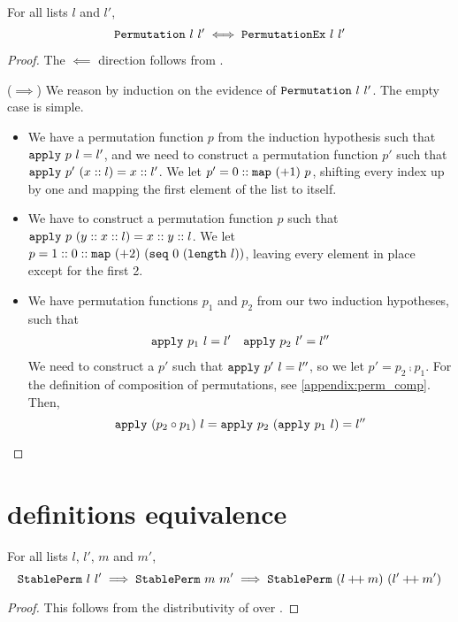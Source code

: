 \documentclass[sigplan,10pt,anonymous,review]{thesis}
\begin{document}
\begin{theorem}
  \label{thm:permutationex_iff}
  For all lists $l$ and $l'$,
  \begin{equation*}
    \texttt{\textup{Permutation}}~l~l' \iff \texttt{\textup{PermutationEx}}~l~l'
  \end{equation*}
\end{theorem}
\begin{proof}
  The $\impliedby$ direction follows from .

  ($\implies$) We reason by induction on the evidence of
  $\texttt{\textup{Permutation}}~l~l'$. The empty case is simple.
  \begin{itemize}
  \item We have a permutation function $p$ from the induction
    hypothesis such that $\texttt{\textup{apply}}~p~l = l'$, and we need to
    construct a permutation function $p'$ such that
    $\texttt{\textup{apply}}~p'~(x::l) = x :: l'$. We let $p' = 0 ::
    \texttt{\textup{map}}~(+1)~p$, shifting every index up by one and mapping
    the first element of the list to itself.
  \item We have to construct a permutation function $p$ such that
    $\texttt{\textup{apply}}~p~(y :: x :: l) = x :: y :: l$. We let $p = 1 :: 0 ::
    \texttt{\textup{map}}~(+2)~(\texttt{\textup{seq}}~0~(\texttt{\textup{length}}~l))$, leaving every
    element in place except for the first 2.
  \item We have permutation functions $p_1$ and $p_2$ from our two
    induction hypotheses, such that
    \begin{align*}
      \texttt{\textup{apply}}~p_1~l = l' && \texttt{\textup{apply}}~p_2~l' = l''
    \end{align*}
    We need to construct a $p'$ such that $\texttt{\textup{apply}}~p'~l=l''$, so
    we let $p' = p_2 \comp p_1$. For the definition of composition of
    permutations, see \cref{appendix:perm_comp}. Then,
    \begin{equation*}
      \texttt{\textup{apply}}~(p_2 \circ p_1)~l =
      \texttt{\textup{apply}}~p_2~(\texttt{\textup{apply}}~p_1~l) = l'' \qedhere
    \end{equation*}
  \end{itemize}
\end{proof}

\section{ definitions equivalence}
\label{appendix:stableperm_def_eq}

\begin{lemma}
  For all lists $l$, $l'$, $m$ and $m'$,
  \begin{equation*}
    \texttt{\textup{StablePerm}}~l~l' \implies \texttt{\textup{StablePerm}}~m~m' \implies
    \texttt{\textup{StablePerm}}~(l \mathbin{+\mkern-3mu+} m)~(l' \mathbin{+\mkern-3mu+} m')
  \end{equation*}
\end{lemma}
\begin{proof}
  This follows from the distributivity of  over .
\end{proof}
\end{document}
